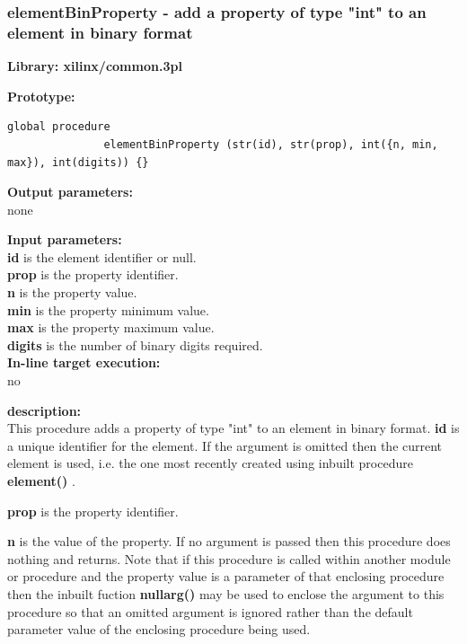         \subsubsection{elementBinProperty - add a property of type "int" to an element in binary format}\label{sec:lpelementBinProperty}
            
            {\bf Library: xilinx/common.3pl}

            {\bf Prototype:} \\
            \vsp
            \begin{lstlisting}[gobble=12, language=threepl]
               global procedure
               elementBinProperty (str(id), str(prop), int({n, min, max}), int(digits)) {}
            \end{lstlisting}

            {\bf Output parameters:} \\
            none

            {\bf Input parameters:} \\            
            {\bf id} is the element identifier or null.\\
            {\bf prop} is the property identifier.\\
            {\bf n} is the property value.\\
            {\bf min} is the property minimum value.\\
            {\bf max} is the property maximum value.\\
            {\bf digits} is the number of binary digits required.\\
        
            {\bf In-line target execution:} \\
            no

            {\bf description:} \\
            This procedure adds a property of type "int" to an element in
            binary format.
            {\bf id} is a unique identifier for the element. If the argument is
            omitted then the current element is used, i.e. the one most recently
            created using inbuilt procedure {\bf element()} .
            
            {\bf prop} is the property identifier.
            
            {\bf n} is the value of the property. If no argument is passed then
            this procedure does nothing and returns. Note that if this procedure
            is called within another module or procedure and the property
            value is a parameter of that enclosing procedure then the inbuilt
            fuction {\bf nullarg()}  may be used to enclose the
            argument to this procedure so that an omitted argument is ignored rather
            than the default parameter value of the enclosing procedure being used.
            

